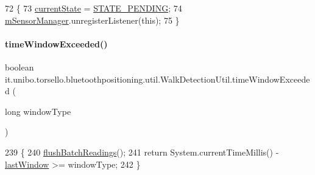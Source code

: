 \begin{DoxyCode}
72                                 \{
73         \hyperlink{classit_1_1unibo_1_1torsello_1_1bluetoothpositioning_1_1util_1_1WalkDetectionUtil_a6d087343f7fa10a9fb4f72bd81b4cde4_a6d087343f7fa10a9fb4f72bd81b4cde4}{currentState} = \hyperlink{classit_1_1unibo_1_1torsello_1_1bluetoothpositioning_1_1util_1_1WalkDetectionUtil_afbb85c995ea51422b96e79d754c68b2e_afbb85c995ea51422b96e79d754c68b2e}{STATE\_PENDING};
74         \hyperlink{classit_1_1unibo_1_1torsello_1_1bluetoothpositioning_1_1util_1_1WalkDetectionUtil_afa8539715b8ef707d07c16e1ff27050d_afa8539715b8ef707d07c16e1ff27050d}{mSensorManager}.unregisterListener(\textcolor{keyword}{this});
75     \}
\end{DoxyCode}
\hypertarget{classit_1_1unibo_1_1torsello_1_1bluetoothpositioning_1_1util_1_1WalkDetectionUtil_a768731013bc5e301ad9d8d55c43213fd_a768731013bc5e301ad9d8d55c43213fd}{}\label{classit_1_1unibo_1_1torsello_1_1bluetoothpositioning_1_1util_1_1WalkDetectionUtil_a768731013bc5e301ad9d8d55c43213fd_a768731013bc5e301ad9d8d55c43213fd} 
\paragraph{\texorpdfstring{time\+Window\+Exceeded()}{timeWindowExceeded()}}
{\footnotesize\ttfamily boolean it.\+unibo.\+torsello.\+bluetoothpositioning.\+util.\+Walk\+Detection\+Util.\+time\+Window\+Exceeded (\begin{DoxyParamCaption}\item[{long}]{window\+Type }\end{DoxyParamCaption})\hspace{0.3cm}{\ttfamily [private]}}


\begin{DoxyCode}
239                                                         \{
240         \hyperlink{classit_1_1unibo_1_1torsello_1_1bluetoothpositioning_1_1util_1_1WalkDetectionUtil_aff54c1b481f94da51f43b3e15e0681d1_aff54c1b481f94da51f43b3e15e0681d1}{flushBatchReadings}();
241         \textcolor{keywordflow}{return} System.currentTimeMillis() - \hyperlink{classit_1_1unibo_1_1torsello_1_1bluetoothpositioning_1_1util_1_1WalkDetectionUtil_a07c9b992e026b470865d4f350d5d6b82_a07c9b992e026b470865d4f350d5d6b82}{lastWindow} >= windowType;
242     \}
\end{DoxyCode}


